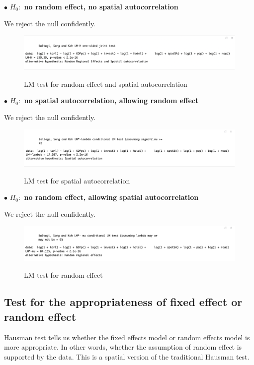 \documentclass[11pt,a4paper]{amsart}
\theoremstyle{plain}
\theoremstyle{definition}
\begin{document}
$\bullet$ \textbf{$H_{0}:$ no random effect, no spatial autocorrelation}\par
We reject the null confidently. 
\begin{figure}[hbt]
	{\centering \includegraphics[scale=0.48]{lmtest1}}
	\caption{LM test for random effect and spatial autocorrelation}\label{F:lmtest1}
\end{figure}

$\bullet$ \textbf{$H_{0}:$ no spatial autocorrelation, allowing random effect}\par
We reject the null confidently. 
\begin{figure}[hbt]
	{\centering \includegraphics[scale=0.48]{lmtest2}}
	\caption{LM test for spatial autocorrelation}\label{F:lmtest2}
\end{figure}

$\bullet$ \textbf{$H_{0}:$ no random effect, allowing spatial autocorrelation}\par
We reject the null confidently. 
\begin{figure}[hbt]
	{\centering \includegraphics[scale=0.48]{lmtest3}}
	\caption{LM test for random effect}\label{F:lmtest3}
\end{figure}

\subsection{Test for  the appropriateness of fixed effect or random effect}\par\hfill

Hausman test tells us whether the fixed effects model or random effects model is more appropriate. In other words, whether the assumption of random effect is supported by the data. This is a spatial version of the traditional Hausman test.
\end{document}
